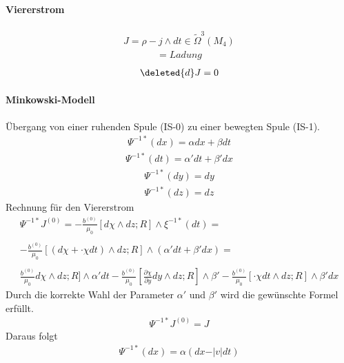 \documentclass[10pt,a4paper]{article}
\begin{document}
\paragraph{Viererstrom} $\, $ \\
\begin{align}
J= \rho -j \wedge dt \in \tilde{\Omega}^3 (M_4)
\end{align}
\begin{align}
[J]= Ladung
\end{align}
\begin{align}
\deleted{d}J=0
\end{align}
\paragraph{Minkowski-Modell} $\,$\\
Übergang von einer ruhenden Spule (IS-0) zu einer bewegten Spule (IS-1).
\begin{align}
\Psi^{-1*} (dx)= \alpha dx + \beta dt
\end{align}
\begin{align}
\Psi^{-1*} (dt) = \alpha' dt + \beta' dx
\end{align}
\begin{align}
\Psi^{-1*} (dy)= dy
\end{align}
\begin{align}
\Psi^{-1*} (dz)= dz
\end{align}
Rechnung für den Viererstrom
\begin{align}
\Psi^{-1*} J^{(0)} = - \frac{b^{(0)}}{\mu_0} [d \chi \wedge dz ; R] \wedge \xi^{-1*} (dt) = \\
\\ -\frac{b^{(0)}}{\mu_0} [(d \chi + \cdot{\chi} dt) \wedge dz ;R] \wedge ( \alpha' dt + \beta' dx ) = \\
\\ \frac{b^{(0)}}{\mu_0}  d \chi \wedge dz ; R ] \wedge \alpha' dt - \frac{b^{(0)}}{\mu_0} [ \frac{ \partial \chi}{\partial y} dy \wedge dz ; R ] \wedge \beta' - \frac{b^{(0)}}{\mu_0} [\cdot{\chi} dt \wedge dz ;R] \wedge \beta' dx
\end{align}
Durch die korrekte Wahl der Parameter $ \alpha' $ und $ \beta ' $ wird die gewünschte Formel erfüllt.
\begin{align}
\Psi^{-1*} J^{(0)} = J
\end{align}
Daraus folgt
\begin{align}
\Psi^{-1*} (dx) = \alpha (dx- \vert v \vert dt) 
\end{align}
\end{document}
